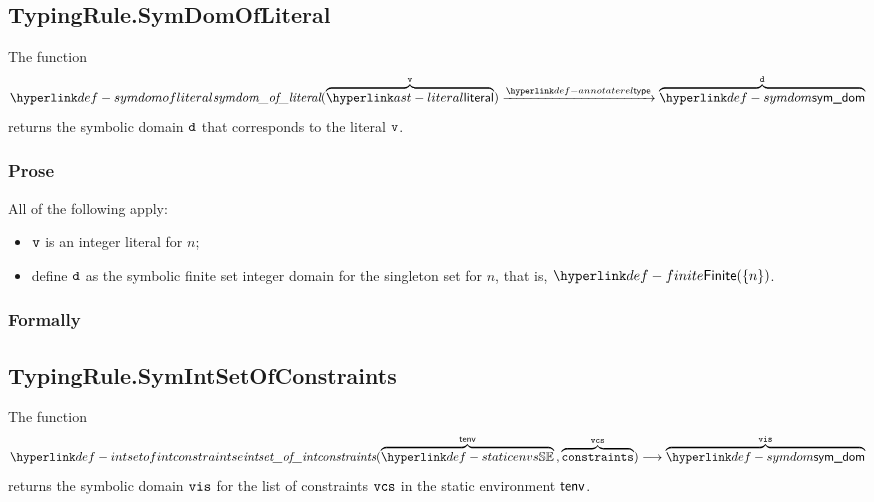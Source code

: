 \begin{mathpar}
\end{mathpar}

\subsection{TypingRule.SymDomOfLiteral \label{sec:TypingRule.SymDomOfLiteral}}
\hypertarget{def-symdomofliteral}{}
The function
\[
\symdomofliteral(\overname{\literal}{\vv}) \typearrow \overname{\symdom}{\vd}
\]
returns the symbolic domain $\vd$ that corresponds to the literal $\vv$.

\subsubsection{Prose}
All of the following apply:
\begin{itemize}
  \item $\vv$ is an integer literal for $n$;
  \item define $\vd$ as the symbolic finite set integer domain for the singleton set for $n$, that is, $\Finite(\{n\})$.
\end{itemize}

\subsubsection{Formally}
\begin{mathpar}
\end{mathpar}

\subsection{TypingRule.SymIntSetOfConstraints \label{sec:TypingRule.SymIntSetOfConstraints}}
\hypertarget{def-intsetofintconstraintse}{}
The function
\[
  \intsetofintconstraints(
    \overname{\staticenvs}{\tenv} \aslsep
    \overname{\constraints}{\vcs}
  ) \aslto
  \overname{\symdom}{\vis}
\]
returns the symbolic domain $\vis$ for the list of constraints $\vcs$
in the static environment $\tenv$.

